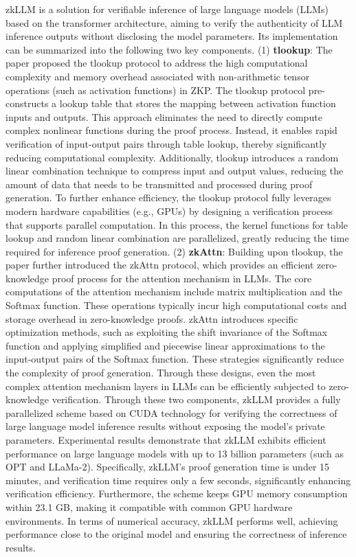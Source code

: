 \documentclass[journal]{IEEEtran}
\begin{document}
zkLLM \cite{sun2024zkllm} is a solution for verifiable inference of large language models (LLMs) based on the transformer architecture, aiming to verify the authenticity of LLM inference  outputs without disclosing the model parameters. Its implementation can be summarized into the following two key components. (1) {\bf tlookup}: The paper proposed the tlookup protocol to address the high computational complexity and memory overhead associated with non-arithmetic tensor operations (such as activation functions) in ZKP. The tlookup protocol pre-constructs a lookup table that stores the mapping between activation function inputs and outputs. This approach eliminates the need to directly compute complex nonlinear functions during the proof process. Instead, it enables rapid verification of input-output pairs through table lookup, thereby significantly reducing computational complexity. Additionally, tlookup introduces a random linear combination technique to compress input and output values, reducing the amount of data that needs to be transmitted and processed during proof generation. To further enhance efficiency, the tlookup protocol fully leverages modern hardware capabilities (e.g., GPUs) by designing a verification process that supports parallel computation. In this process, the kernel functions for table lookup and random linear combination are parallelized, greatly reducing the time required for inference proof generation. (2) {\bf zkAttn}: Building upon tlookup, the paper further introduced the zkAttn protocol, which provides an efficient zero-knowledge proof process for the attention mechanism in LLMs. The core computations of the attention mechanism include matrix multiplication and the Softmax function. These operations typically incur high computational costs and storage overhead in zero-knowledge proofs. zkAttn introduces specific optimization methods, such as exploiting the shift invariance of the Softmax function and applying simplified and piecewise linear approximations to the input-output pairs of the Softmax function. These strategies significantly reduce the complexity of proof generation. Through these designs, even the most complex attention mechanism layers in LLMs can be efficiently subjected to zero-knowledge verification. Through these two components, zkLLM provides a fully parallelized scheme based on CUDA technology for verifying the correctness of large language model inference results without exposing the model's private parameters. Experimental results demonstrate that zkLLM exhibits efficient performance on large language models with up to 13 billion parameters (such as OPT and LLaMa-2). Specifically, zkLLM's proof generation time is under 15 minutes, and verification time requires only a few seconds, significantly enhancing verification efficiency. Furthermore, the scheme keeps GPU memory consumption within 23.1 GB, making it compatible with common GPU hardware environments. In terms of numerical accuracy, zkLLM performs well, achieving performance close to the original model and ensuring the correctness of inference results.
\end{document}

